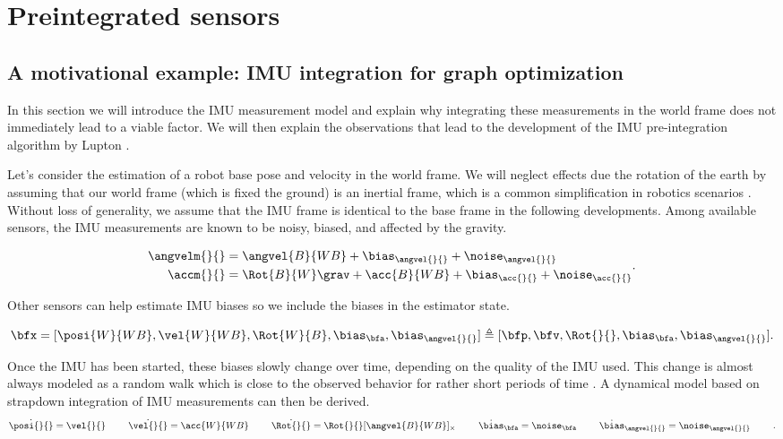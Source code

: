 \chapter{Preintegrated sensors}
\label{chp:preintegration}
\minitoc

\label{chp:preintegrated}

  
\section{A motivational example: IMU integration for graph optimization}
In this section we will introduce the IMU measurement model and explain why integrating these measurements in the world frame does not immediately
lead to a viable factor. We will then explain the observations that lead to the development of the IMU pre-integration algorithm by Lupton \cite{lupton-09}.

Let's consider the estimation of a robot base pose and velocity in the world frame. We will neglect effects due the rotation of the earth by assuming 
that our world frame (which is fixed \wrt the ground) is an inertial frame, which
is a common simplification in robotics scenarios \cite{forster2017-TRO}. Without loss of generality, we assume that the IMU frame is identical to the base frame 
in the following developments. Among available sensors, the IMU measurements are known to be noisy, biased, and affected by the gravity.

\begin{equation}
    \begin{split}
    \angvelm{}{} &= \angvel{B}{WB} + \bias_{\angvel{}{}} + \noise_{\angvel{}{}} 
    \\
    \accm{}{}    &= \Rot{B}{W} \grav + \acc{B}{WB} + \bias_{\acc{}{}} + \noise_{\acc{}{}} 
    \end{split}.
    \label{eq:imu_meas_model}
\end{equation}
    
Other sensors can help estimate IMU biases so we include the biases in the estimator state.

\begin{equation}
    \bfx = [\posi{W}{WB}, \vel{W}{WB}, \Rot{W}{B}, \bias_{\bfa}, \bias_{\angvel{}{}}]
    \triangleq 
    [\bfp, \bfv, \Rot{}{}, \bias_{\bfa}, \bias_{\angvel{}{}}] .
\end{equation}

Once the IMU has been started, these biases slowly change over time, depending on the quality of the IMU used. This change is almost always modeled 
as a random walk which is close to the observed behavior for rather short periods of time \cite{hussen2015low}.
A dynamical model based on strapdown integration of IMU measurements can then be derived.
%
\begin{equation}
    \begin{split}
    \dot{\posi{}{}} = \vel{}{}  ~~~~~~~
    \dot{\vel{}{}} = \acc{W}{WB} ~~~~~~~
    \dot{\Rot{}{}} = \Rot{}{} [\angvel{B}{WB}]_{\times} ~~~~~~~
    \dot{\bias}_{\bfa} = \noise_{\bfa}  ~~~~~~~
    \dot{\bias}_{\angvel{}{}} = \noise_{\angvel{}{}} ~~~~~~~
    \end{split}.
    \label{eq:imu_dyn_conti}
\end{equation}

